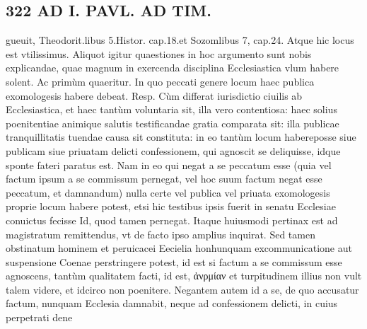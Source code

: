 \documentclass{article}
\begin{document}
\begin{pages}
\section*{322 AD I. PAVL. AD TIM. }\pstart gueuit, Theodorit.libus 5.Histor. cap.18.et Sozomlibus 7, cap.24. Atque hic locus est vtilissimus.  \pend\pstart Aliquot igitur quaestiones in hoc argumento sunt nobis explicandae, quae magnum in exercenda disciplina Ecclesiastica vlum habere solent. Ac primùm quaeritur.  \pend\pstart In quo peccati genere locum haec publica exomologesis habere debeat. Resp. Cùm differat iurisdictio ciuilis ab Ecclesiastica, et haec tantùm voluntaria sit, illa vero contentiosa: haec solius poenitentiae animique salutis testificandae gratia comparata sit: illa publicae tranquillitatis tuendae causa sit constituta: in eo tantùm locum habereposse siue publicam siue priuatam delicti confessionem, qui agnoscit se deliquisse, idque sponte fateri paratus est. Nam in eo qui negat a se peccatum esse (quia vel factum ipsum a se commissum pernegat, vel hoc suum factum negat esse peccatum, et damnandum) nulla certe vel publica vel priuata exomologesis proprie locum habere potest, etsi hic testibus ipsis fuerit in senatu Ecclesiae conuictus fecisse Id, quod tamen pernegat. Itaque huiusmodi pertinax est ad magistratum remittendus, vt de facto ipso amplius inquirat. Sed tamen obstinatum hominem et peruicacei Eecielia honhunquam excommunicatione aut suspensione Coenae perstringere potest, id est si factum a se commissum esse agnoscens, tantùm qualitatem facti, id est, ἀνρμίαν et turpitudinem illius non vult talem videre, et idcirco non poenitere. Negantem autem id a se, de quo accusatur factum, nunquam Ecclesia damnabit, neque ad confessionem delicti, in cuius perpetrati dene\pend

\end{pages}
\end{document}
